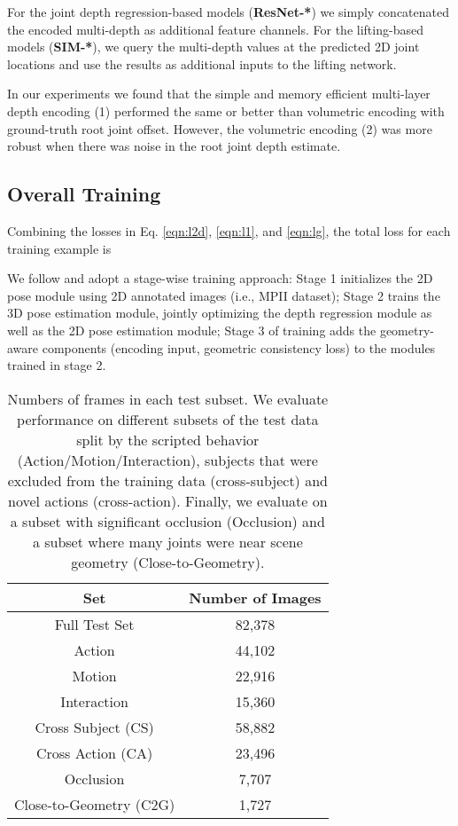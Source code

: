 \documentclass[times,referee,twocolumn,final,authoryear]{elsarticle}
\begin{document}
For the joint depth regression-based models ({\bf ResNet-*}) we simply concatenated the 
encoded multi-depth as additional feature channels.  For the lifting-based models
({\bf SIM-*}), we query the multi-depth values at the predicted 2D joint locations 
and use the results as additional inputs to the lifting network.

In our experiments we found that the simple and memory efficient multi-layer depth 
encoding (1) performed the same or better than volumetric encoding with ground-truth 
root joint offset. However, the volumetric encoding (2) was more robust when there was 
noise in the root joint depth estimate.

\subsection{Overall Training}

Combining the losses in Eq.  \ref{eqn:l2d}, \ref{eqn:l1}, and
\ref{eqn:lg}, the total loss for each training example is 

We follow \cite{Zhou_2017_ICCV} and adopt a stage-wise training approach: Stage
1 initializes the 2D pose module using 2D annotated images (i.e., MPII dataset);
Stage 2 trains the 3D pose estimation module, jointly optimizing the depth regression
module as well as the 2D pose estimation module; Stage 3 of training adds the
geometry-aware components (encoding input, geometric consistency loss) to the 
modules trained in stage 2.

\begin{table}[t]
\begin{center}
\small
\begin{tabular}{c|c}
\hline
\textbf{Set} & \textbf{Number of Images} \\ 
\hline
Full Test Set & 82,378 \\
\hline\hline
Action & 44,102 \\
Motion & 22,916 \\
Interaction &  15,360 \\
\hline
\hline
Cross Subject (CS) & 58,882 \\
Cross Action (CA) & 23,496 \\
\hline
\hline
Occlusion & 7,707 \\
Close-to-Geometry (C2G) & 1,727  \\
\hline
\end{tabular}
\end{center}
\caption{Numbers of frames in each test subset. We evaluate performance on
different subsets of the test data split by the scripted behavior
(Action/Motion/Interaction), subjects that were excluded from the training data
(cross-subject) and novel actions (cross-action). Finally, we evaluate on a
subset with significant occlusion (Occlusion) and a subset where many joints
were near scene geometry (Close-to-Geometry).}
\label{table:testset}
\end{table}
\end{document}
